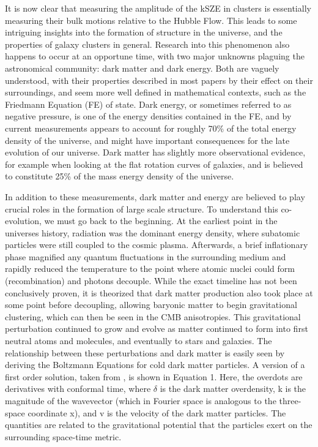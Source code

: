 \documentclass[manuscript]{aastex}
\begin{document}
It is now clear that measuring the amplitude of the kSZE in clusters is essentially measuring their bulk motions relative to the Hubble Flow. This leads to some intriguing insights into the formation of structure in the universe, and the properties of galaxy clusters in general. Research into this phenomenon also happens to occur at an opportune time, with two major unknowns plaguing the astronomical community: dark matter and dark energy. Both are vaguely understood, with their properties described in most papers by their effect on their surroundings,  and seem more well defined in mathematical contexts, such as the Friedmann Equation (FE) of state. Dark energy, or sometimes referred to as negative pressure, is one of the energy densities contained in the FE, and by current measurements appears to account for roughly 70\% of the total energy density of the universe, and might have important consequences for the late evolution of our universe. Dark matter has slightly more observational evidence, for example when looking at the flat rotation curves of galaxies, and is believed to constitute 25\% of the mass energy density of the universe.

In addition to these measurements, dark matter and energy are believed to play crucial roles in the formation of large scale structure. To understand this co-evolution, we must go back to the beginning. At the earliest point in the universes history, radiation was the dominant energy density, where subatomic particles were still coupled to the cosmic plasma. Afterwards, a brief inflationary phase magnified any quantum fluctuations in the surrounding medium and rapidly reduced the temperature to the point where atomic nuclei could form (recombination) and photons decouple. While the exact timeline has not been conclusively proven, it is theorized that dark matter production also took place at some point before decoupling, allowing baryonic matter to begin gravitational clustering, which can then be seen in the CMB anisotropies. This gravitational perturbation continued to grow and evolve as matter continued to form into first neutral atoms and molecules, and eventually to stars and galaxies. The relationship between these perturbations and dark matter is easily seen by deriving the Boltzmann Equations for cold dark matter particles. A version of a first order solution, taken from \cite{Dodelson2003}, is shown in Equation 1. Here, the overdots are derivatives with conformal time, where \(\delta\) is the dark matter overdensity, k is the magnitude of the wavevector (which in Fourier space is analogous to the three-space coordinate x), and v is the velocity of the dark matter particles. The quantities are related to the gravitational potential that the particles exert on the surrounding space-time metric.
\end{document}
